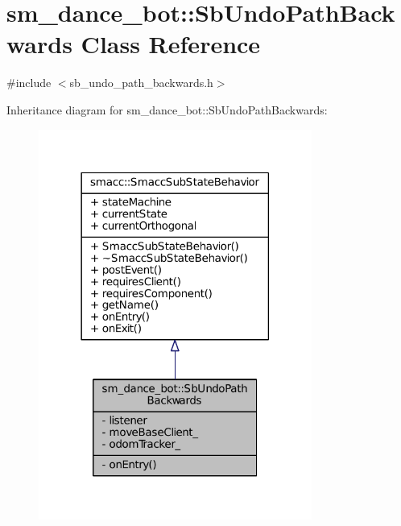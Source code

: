 \hypertarget{classsm__dance__bot_1_1SbUndoPathBackwards}{}\section{sm\+\_\+dance\+\_\+bot\+:\+:Sb\+Undo\+Path\+Backwards Class Reference}
\label{classsm__dance__bot_1_1SbUndoPathBackwards}


{\ttfamily \#include $<$sb\+\_\+undo\+\_\+path\+\_\+backwards.\+h$>$}



Inheritance diagram for sm\+\_\+dance\+\_\+bot\+:\+:Sb\+Undo\+Path\+Backwards\+:
\nopagebreak
\begin{figure}[H]
\begin{center}
\leavevmode
\includegraphics[width=254pt]{classsm__dance__bot_1_1SbUndoPathBackwards__inherit__graph}
\end{center}
\end{figure}


